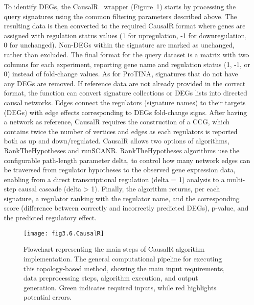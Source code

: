 To identify \gls{DEGs}, the CausalR~\cite{RN32} wrapper (Figure~\ref{fig:fig3.6.CausalR}) starts by processing the query signatures using the common filtering parameters described above. The resulting data is then converted to the required CausalR format where genes are assigned with regulation status values (1 for upregulation, -1 for downregulation, 0 for unchanged). Non-\gls{DEGs} within the signature are marked as unchanged, rather than excluded. The final format for the query dataset is a matrix with two columns for each experiment, reporting gene name and regulation status (1, -1, or 0) instead of fold-change values. As for \gls{ProTINA}, signatures that do not have any \gls{DEGs} are removed. If reference data are not already provided in the correct format, the function can convert signature collections or \gls{DEGs} lists into directed causal networks. Edges connect the regulators (signature names) to their targets (\gls{DEGs}) with edge effects corresponding to \gls{DEGs} fold-change signs. 
After having a network as reference, CausalR requires the construction of a \gls{CCG}, which contains twice the number of vertices and edges as each regulators is reported both as up and down/regulated. CausalR allows two options of algorithms, RankTheHypotheses and runSCANR. RankTheHypotheses algorithms use the configurable path-length parameter delta, to control how many network edges can be traversed from regulator hypotheses to the observed gene expression data, enabling from a direct transcriptional regulation (delta = 1) analysis to a multi-step causal cascade (delta > 1). Finally, the algorithm returns, per each signature, a regulator ranking with the regulator name, and the corresponding score (difference between correctly and incorrectly predicted \gls{DEGs}), p-value, and the predicted regulatory effect.

\begin{figure}[htbp]
    \centering
    \texttt{[image: fig3.6.CausalR]}
    \caption[Flowchart representing the main steps of CausalR algorithm implementation.]{Flowchart representing the main steps of CausalR algorithm implementation. The general computational pipeline for executing this topology-based method, showing the main input requirements, data preprocessing steps, algorithm execution, and output generation. Green indicates required inputs, while red highlights potential errors.}
    \label{fig:fig3.6.CausalR}
\end{figure}

